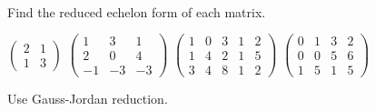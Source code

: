 \begin{exercises}
\begin{answer}
\begin{exparts}
\begin{multline*}
        \end{multline*}
       \end{exparts}  
     \end{answer}
  \recommended \item 
    Find the reduced echelon form of each matrix.
    \begin{exparts*}
      \partsitem \( \begin{pmatrix}
          2  &1  \\
          1  &3
        \end{pmatrix}  \)
      \partsitem \( \begin{pmatrix}
          1  &3  &1  \\
          2  &0  &4  \\
         -1  &-3 &-3
        \end{pmatrix}  \)
      \partsitem \( \begin{pmatrix}
          1  &0  &3  &1  &2  \\
          1  &4  &2  &1  &5  \\
          3  &4  &8  &1  &2
        \end{pmatrix}  \)
      \partsitem \( \begin{pmatrix}
          0  &1  &3  &2  \\
          0  &0  &5  &6  \\
          1  &5  &1  &5
        \end{pmatrix}  \)
    \end{exparts*}
    \begin{answer}
      Use Gauss-Jordan reduction.
\end{answer}
\end{exercises}
